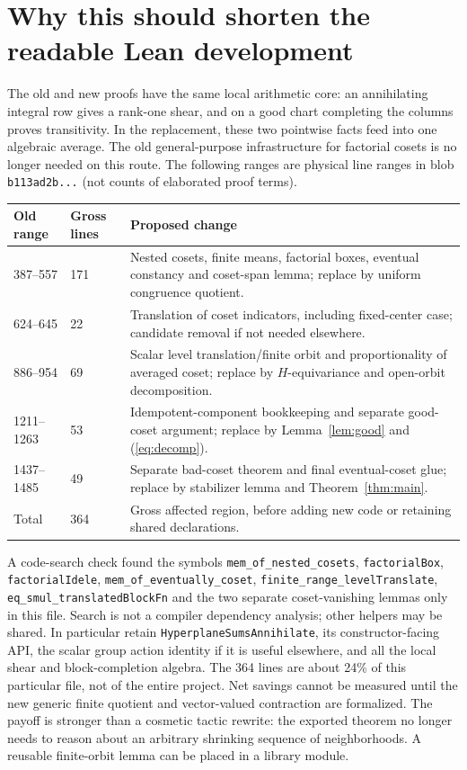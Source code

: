 \documentclass[11pt,letterpaper]{article}
\begin{document}
\section{Why this should shorten the readable Lean development}
The old and new proofs have the same local arithmetic core: an annihilating integral row gives a rank-one shear, and on a good chart completing the columns proves transitivity. In the replacement, these two pointwise facts feed into one algebraic average. The old general-purpose infrastructure for factorial cosets is no longer needed on this route. The following ranges are physical line ranges in blob \texttt{b113ad2b...} (not counts of elaborated proof terms).
\begin{center}
\begin{tabularx}{\linewidth}{@{}p{.18\linewidth}p{.13\linewidth}X@{}}
\toprule
Old range & Gross lines & Proposed change\\
\midrule
387--557 & 171 & Nested cosets, finite means, factorial boxes, eventual constancy and coset-span lemma; replace by uniform congruence quotient.\\
624--645 & 22 & Translation of coset indicators, including fixed-center case; candidate removal if not needed elsewhere.\\
886--954 & 69 & Scalar level translation/finite orbit and proportionality of averaged coset; replace by $H$-equivariance and open-orbit decomposition.\\
1211--1263 & 53 & Idempotent-component bookkeeping and separate good-coset argument; replace by Lemma~\ref{lem:good} and (\ref{eq:decomp}).\\
1437--1485 & 49 & Separate bad-coset theorem and final eventual-coset glue; replace by stabilizer lemma and Theorem~\ref{thm:main}.\\
\midrule
Total & 364 & Gross affected region, before adding new code or retaining shared declarations.\\
\bottomrule
\end{tabularx}
\end{center}
A code-search check found the symbols \texttt{mem\_of\_nested\_cosets}, \texttt{factorialBox}, \texttt{factorialIdele}, \texttt{mem\_of\_eventually\_coset}, \texttt{finite\_range\_levelTranslate}, \texttt{eq\_smul\_translatedBlockFn} and the two separate coset-vanishing lemmas only in this file. Search is not a compiler dependency analysis; other helpers may be shared. In particular retain \texttt{HyperplaneSumsAnnihilate}, its constructor-facing API, the scalar group action identity if it is useful elsewhere, and all the local shear and block-completion algebra. The 364 lines are about 24\% of this particular file, not of the entire project. Net savings cannot be measured until the new generic finite quotient and vector-valued contraction are formalized. The payoff is stronger than a cosmetic tactic rewrite: the exported theorem no longer needs to reason about an arbitrary shrinking sequence of neighborhoods. A reusable finite-orbit lemma can be placed in a library module.
\end{document}
